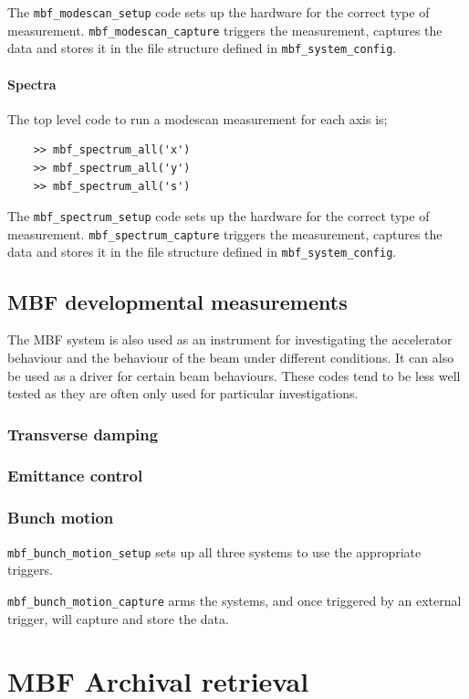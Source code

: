 \documentclass{report}
\begin{document}
The \verb|mbf_modescan_setup| code sets up the hardware for the correct type of measurement. \verb|mbf_modescan_capture| triggers the measurement, captures the data and stores it in the file structure defined in \verb|mbf_system_config|. 
\subsubsection{Spectra}
The top level code to run a modescan measurement for each axis is; 
\begin{verbatim}
    >> mbf_spectrum_all('x') 
    >> mbf_spectrum_all('y') 
    >> mbf_spectrum_all('s') 
\end{verbatim}

The \verb|mbf_spectrum_setup| code sets up the hardware for the correct type of measurement. \verb|mbf_spectrum_capture| triggers the measurement, captures the data and stores it in the file structure defined in \verb|mbf_system_config|. 

\section{MBF developmental measurements}
The MBF system is also used as an instrument for investigating the accelerator behaviour and the behaviour of the beam under different conditions. It can also be used as a driver for certain beam behaviours. These codes tend to be less well tested as they are often only used for particular investigations.
\subsection{Transverse damping}
\subsection{Emittance control}
\subsection{Bunch motion}
 \verb|mbf_bunch_motion_setup| sets up all three systems to use the appropriate triggers. 
 
 \verb|mbf_bunch_motion_capture| arms the systems, and once triggered by an external trigger, will capture and store the data.

\chapter{MBF Archival retrieval}
\end{document}

